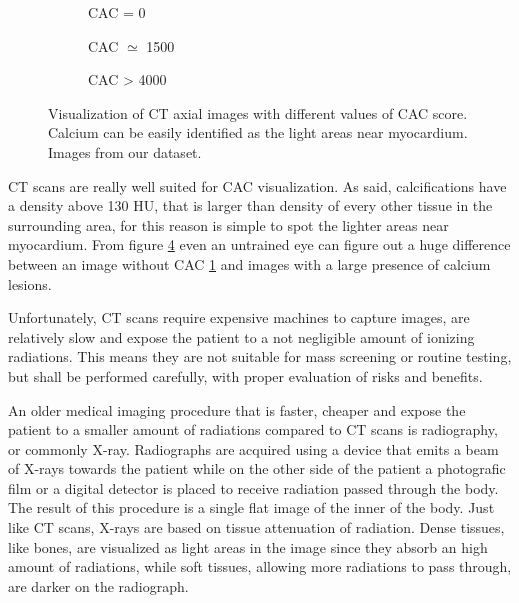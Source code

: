 \begin{figure}
    \centering
    \begin{subfigure}[b]{0.3\textwidth}
        \caption{CAC = 0}
        \label{subfig:ct_cac_0}
    \end{subfigure}\hspace{1em}
    \begin{subfigure}[b]{0.3\textwidth}
        \caption{CAC $\simeq$ 1500}
        \label{subfig:ct_cac_1500}
    \end{subfigure}\hspace{1em}
    \begin{subfigure}[b]{0.3\textwidth}
        \caption{CAC > 4000}
        \label{subfig:ct_cac_4000}
    \end{subfigure}
    
    \caption{Visualization of CT axial images with different values of CAC score. Calcium can be easily identified as the light areas near myocardium. Images from our dataset.}
    \label{fig:ct_cacs}
\end{figure}

CT scans are really well suited for CAC visualization.
As said, calcifications have a density above 130 HU, that is larger than density of every other tissue in the surrounding area, for this reason is simple to spot the lighter areas near myocardium.
From figure \ref{fig:ct_cacs} even an untrained eye can figure out a huge difference between an image without CAC \ref{subfig:ct_cac_0} and images with a large presence of calcium lesions.

Unfortunately, CT scans require expensive machines to capture images, are relatively slow and expose the patient to a not negligible amount of ionizing radiations.
This means they are not suitable for mass screening or routine testing, but shall be performed carefully, with proper evaluation of risks and benefits.

An older medical imaging procedure that is faster, cheaper and expose the patient to a smaller amount of radiations compared to CT scans is radiography, or commonly X-ray.
Radiographs are acquired using a device that emits a beam of X-rays towards the patient while on the other side of the patient a photografic film or a digital detector is placed to receive radiation passed through the body.
The result of this procedure is a single flat image of the inner of the body.
Just like CT scans, X-rays are based on tissue attenuation of radiation.
Dense tissues, like bones, are visualized as light areas in the image since they absorb an high amount of radiations, while soft tissues, allowing more radiations to pass through, are darker on the radiograph.


